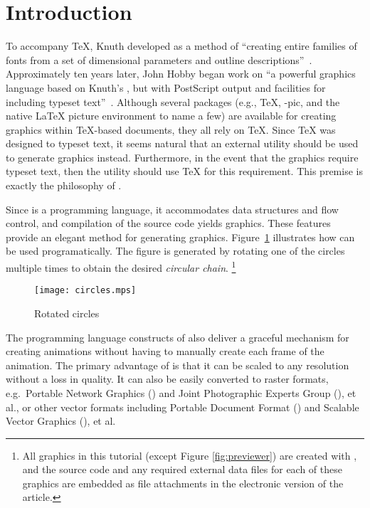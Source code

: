 \section{Introduction}
\label{sec:introduction}

To accompany \TeX{}, Knuth developed \MF{} as a method of ``creating
entire families of fonts from a set of dimensional parameters and
outline descriptions''~\cite{beebe:mf}.  Approximately ten years later,
John Hobby began work on \MP{}\Dash ``a powerful graphics language based
on Knuth's \MF, but with PostScript output and facilities for including
typeset text''~\cite{hobby:user}.  Although several packages (e.g.,
\PiC\TeX, \Xy-pic, and the native \LaTeX{} picture environment to name a
few) are available for creating graphics within \TeX-based documents,
they all rely on \TeX{}.  Since \TeX{} was designed to typeset text, it
seems natural that an external utility should be used to generate
graphics instead.  Furthermore, in the event that the graphics require
typeset text, then the utility should use \TeX{} for this requirement.
This premise is exactly the philosophy of \MP.

Since \MP{} is a programming language, it accommodates data structures
and flow control, and compilation of the \MP{} source code yields \EPS{}
graphics.  These features provide an elegant method for generating
graphics.  Figure~\ref{fig:circles} illustrates how \MP{} can be used
programatically.  The figure is generated by rotating one of the circles
multiple times to obtain the desired \textit{circular chain}.%
\footnote{All graphics in this tutorial (except Figure
  \ref{fig:previewer}) are created with \MP{}, and the source code and
  any required external data files for each of these graphics are
  embedded as file attachments in the electronic \PDF{} version of the
  article.}

\begin{figure}
  \centering
  \texttt{[image: circles.mps]}
  \caption{Rotated circles}
  \label{fig:circles}
\end{figure}

The programming language constructs of \MP{} also deliver a graceful
mechanism for creating animations without having to manually create each
frame of the animation.  The primary advantage of \EPS{} is that it can
be scaled to any resolution without a loss in quality.  It can also be
easily converted to raster formats, e.g.\ Portable Network Graphics
(\PNG) and Joint Photographic Experts Group (\JPEG), et al., or other
vector formats including Portable Document Format (\PDF) and Scalable
Vector Graphics (\SVG), et al.
